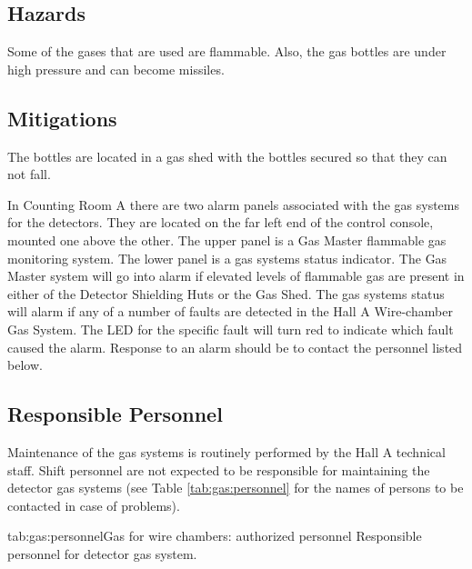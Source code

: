 \begin{safetyen}{0}{0}
\label{sec:hrs-det-gasalarms}

\subsection{Hazards}

Some of the gases that are used are flammable.  Also, the gas bottles
are under high pressure and can become missiles.

\subsection{Mitigations}

The bottles are located in a gas shed with the bottles secured so that
they can not fall.

In Counting Room A there are two alarm panels associated with the gas
systems for the detectors.  They are located on the far left end of the
control console, mounted one above the other.  The upper panel is a
Gas Master flammable gas monitoring system.  The lower panel is a gas
systems status indicator.  The Gas Master system will go into alarm if
elevated levels of flammable gas are present in either of the Detector
Shielding Huts or the Gas Shed.
The gas systems status will
alarm if any of a number of faults are detected in the Hall A Wire-chamber
Gas System.  The LED for the specific fault will turn red to indicate which
fault caused the alarm.
Response to an alarm should be to contact the personnel listed below.

\subsection{Responsible Personnel}

Maintenance of the gas systems is routinely performed by the Hall A
technical staff.  Shift personnel are not expected to be responsible
for maintaining the detector gas systems (see Table \ref{tab:gas:personnel}  
for the names of persons to be contacted in case of problems). 

\begin{namestab}{tab:gas:personnel}{Gas for wire chambers: authorized personnel}{%
      Responsible personnel for detector gas system.}
  \JackSegal{}
\end{namestab}
\end{safetyen}
